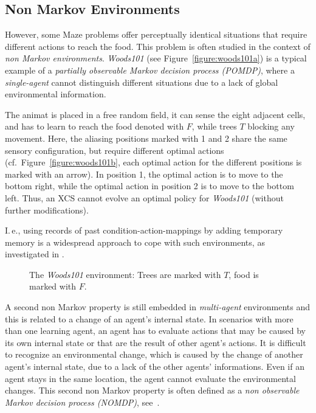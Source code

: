 \subsection{Non Markov Environments}
\label{subsection:non-markov-environments}

However, some Maze problems offer perceptually identical situations that require different actions to reach the food. This problem is often studied in the context of \emph{non Markov environments}. \emph{Woods101} (see Figure~\ref{figure:woods101a}) is a typical example of a \emph{partially observable Markov decision process (POMDP)}, where a \emph{single-agent} cannot distinguish different situations due to a lack of global environmental information. 

The animat is placed in a free random field, it can sense the eight adjacent cells, and has to learn to reach the food denoted with $F$, while trees $T$ blocking any movement. Here, the aliasing positions marked with 1 and 2 share the same sensory configuration, but require different optimal actions (cf.\ Figure~\ref{figure:woods101b}, each optimal action for the different positions is marked with an arrow). In position 1, the optimal action is to move to the bottom right, while the optimal action in position 2 is to move to the bottom left. Thus, an XCS cannot evolve an optimal policy for \emph{Woods101} (without further modifications).

I.\,e., using records of past condition-action-mappings by adding temporary memory is a widespread approach to cope with such environments, as investigated in \cite{Lan98,LW00}.

\begin{figure}[ht]
  \hfill
  \hfill
  \caption{The \emph{Woods101} environment: Trees are marked with $T$, food is marked with $F$.}
  \label{figure:woods101}
\end{figure}

A second non Markov property is still embedded in \emph{multi-agent} environments and this is related to a change of an agent's internal state. In scenarios with more than one learning agent, an agent has to evaluate actions that may be caused by its own internal state or that are the result of other agent's actions. It is difficult to recognize an environmental change, which is caused by the change of another agent's internal state, due to a lack of the other agents' informations. Even if an agent stays in the same location, the agent cannot evaluate the environmental changes. This second non Markov property is often defined as a \emph{non observable Markov decision process (NOMDP)}, see~\cite{TTS01}.

